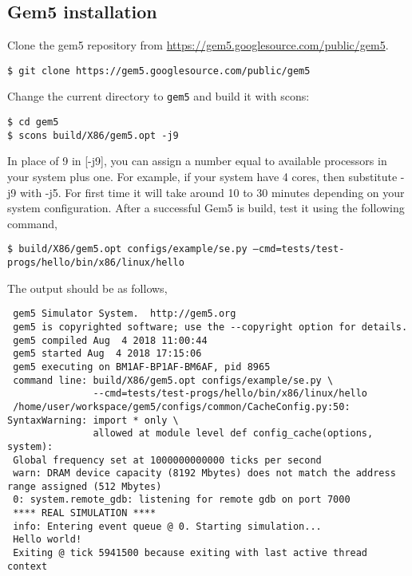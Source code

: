 \documentclass{article}
\begin{document}
\subsection*{Gem5 installation} 
Clone the gem5 repository from \url{https://gem5.googlesource.com/public/gem5}.

\vspace{0.25cm}
\noindent
\texttt{\$ git clone https://gem5.googlesource.com/public/gem5}

\vspace{0.25cm}
\noindent
Change the current directory to \texttt{gem5} and build it with scons:

\vspace{0.25cm}
\noindent
\texttt{\$ cd gem5 \\
 \$ scons build/X86/gem5.opt -j9}

\vspace{0.25cm}
\noindent
In place of 9 in [-j9], you can assign a number equal to available processors in your system plus one. 
For example, if your system have 4 cores, then substitute -j9 with -j5. 
For first time it will take around 10 to 30 minutes depending on your system configuration. 
After a successful Gem5 is build, test it using the following command,


\vspace{0.25cm}
\noindent
\texttt{\$ build/X86/gem5.opt configs/example/se.py --cmd=tests/test-progs/hello/bin/x86/linux/hello}

\vspace{0.25cm}
\noindent
The output should be as follows,
\begin{verbatim}
 gem5 Simulator System.  http://gem5.org
 gem5 is copyrighted software; use the --copyright option for details.
 gem5 compiled Aug  4 2018 11:00:44
 gem5 started Aug  4 2018 17:15:06
 gem5 executing on BM1AF-BP1AF-BM6AF, pid 8965
 command line: build/X86/gem5.opt configs/example/se.py \
               --cmd=tests/test-progs/hello/bin/x86/linux/hello
 /home/user/workspace/gem5/configs/common/CacheConfig.py:50: SyntaxWarning: import * only \ 
               allowed at module level def config_cache(options, system):
 Global frequency set at 1000000000000 ticks per second
 warn: DRAM device capacity (8192 Mbytes) does not match the address range assigned (512 Mbytes)
 0: system.remote_gdb: listening for remote gdb on port 7000
 **** REAL SIMULATION ****
 info: Entering event queue @ 0. Starting simulation...
 Hello world!
 Exiting @ tick 5941500 because exiting with last active thread context 
\end{verbatim}
\end{document}
